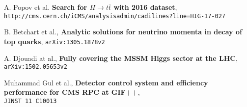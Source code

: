 \documentclass[12pt]{article}
\begin{document}
\begin{thebibliography}{9}
A. Popov et al. 
\textbf{Search for $H\rightarrow t \bar t$ with 2016 dataset},
\texttt{http://cms.cern.ch/iCMS/analysisadmin/cadilines?line=HIG-17-027}

B. Betchart et al., 
\textbf{Analytic solutions for neutrino momenta in decay of top quarks},
\texttt{arXiv:1305.1878v2}
 
A. Djouadi at al.,
\textbf{Fully covering the MSSM Higgs sector at the LHC},
\\\texttt{arXiv:1502.05653v2}

Muhammad Gul et al.,
\textbf{Detector control system and efficiency performance for CMS RPC at GIF++},
\\\texttt{JINST 11 C10013}
\end{thebibliography}
\end{document}
